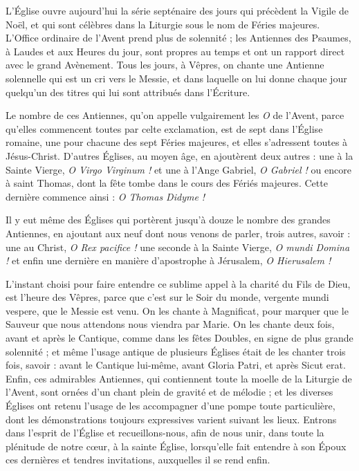 \documentclass[%
fontsize=10%
,a6paper%
,DIV=15%
]{scrartcl}
\title{\centrer{Grandes Antiennes de l'Avent}}
\author{ou Antiennes O}
\date{du 17 au 23 décembre}
\begin{document}
\newcommand{\ligne}[2]{
\begin{center}
\greseparator{#1}{#2}
\end{center}
}
\thispagestyle{empty}
\maketitle
\thispagestyle{empty}

L’Église ouvre aujourd’hui la série septénaire des jours qui précèdent la Vigile de Noël, et qui sont célèbres dans la Liturgie sous le nom de Féries majeures. L’Office ordinaire de l’Avent prend plus de solennité ; les Antiennes des Psaumes, à Laudes et aux Heures du jour, sont propres au temps et ont un rapport direct avec le grand Avènement. Tous les jours, à Vêpres, on chante une Antienne solennelle qui est un cri vers le Messie, et dans laquelle on lui donne chaque jour quelqu’un des titres qui lui sont attribués dans l’Écriture.

Le nombre de ces Antiennes, qu’on appelle vulgairement les \emph{O} de l’Avent, parce qu’elles commencent toutes par celte exclamation, est de sept dans l’Église romaine, une pour chacune des sept Féries majeures, et elles s’adressent toutes à Jésus-Christ. D’autres Églises, au moyen âge, en ajoutèrent deux autres : une à la Sainte Vierge, \emph{O Virgo Virginum !} et une à l’Ange Gabriel, \emph{O Gabriel !} ou encore à saint Thomas, dont la fête tombe dans le cours des Fériés majeures. Cette dernière commence ainsi : \emph{O Thomas Didyme !}

Il y eut même des Églises qui portèrent jusqu’à douze le nombre des grandes Antiennes, en ajoutant aux neuf dont nous venons de parler, trois autres, savoir : une au Christ, \emph{O Rex pacifice !} une seconde à la Sainte Vierge, \emph{O mundi Domina !} et enfin une dernière en manière d’apostrophe à Jérusalem, \emph{O Hierusalem !}

L’instant choisi pour faire entendre ce sublime appel à la charité du Fils de Dieu, est l’heure des Vêpres, parce que c’est sur le Soir du monde, vergente mundi vespere, que le Messie est venu. On les chante à Magnificat, pour marquer que le Sauveur que nous attendons nous viendra par Marie. On les chante deux fois, avant et après le Cantique, comme dans les fêtes Doubles, en signe de plus grande solennité ; et même l’usage antique de plusieurs Églises était de les chanter trois fois, savoir : avant le Cantique lui-même, avant Gloria Patri, et après Sicut erat. Enfin, ces admirables Antiennes, qui contiennent toute la moelle de la Liturgie de l’Avent, sont ornées d’un chant plein de gravité et de mélodie ; et les diverses Églises ont retenu l’usage de les accompagner d’une pompe toute particulière, dont les démonstrations toujours expressives varient suivant les lieux. Entrons dans l’esprit de l’Église et recueillons-nous, afin de nous unir, dans toute la plénitude de notre cœur, à la sainte Église, lorsqu’elle fait entendre à son Époux ces dernières et tendres invitations, auxquelles il se rend enfin.
\end{document}
